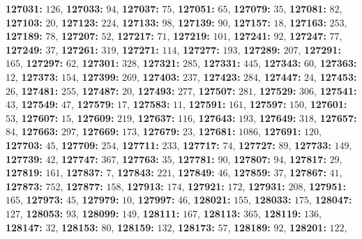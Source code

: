 \textsf{\bfseries 127031:} $126$, \textsf{\bfseries 127033:} $94$, \textsf{\bfseries 127037:} $75$, \textsf{\bfseries 127051:} $65$, \textsf{\bfseries 127079:} $35$, \textsf{\bfseries 127081:} $82$, \textsf{\bfseries 127103:} $20$, \textsf{\bfseries 127123:} $224$, \textsf{\bfseries 127133:} $98$, \textsf{\bfseries 127139:} $90$, \textsf{\bfseries 127157:} $18$, \textsf{\bfseries 127163:} $253$, \textsf{\bfseries 127189:} $78$, \textsf{\bfseries 127207:} $52$, \textsf{\bfseries 127217:} $71$, \textsf{\bfseries 127219:} $101$, \textsf{\bfseries 127241:} $92$, \textsf{\bfseries 127247:} $77$, \textsf{\bfseries 127249:} $37$, \textsf{\bfseries 127261:} $319$, \textsf{\bfseries 127271:} $114$, \textsf{\bfseries 127277:} $193$, \textsf{\bfseries 127289:} $207$, \textsf{\bfseries 127291:} $165$, \textsf{\bfseries 127297:} $62$, \textsf{\bfseries 127301:} $328$, \textsf{\bfseries 127321:} $285$, \textsf{\bfseries 127331:} $445$, \textsf{\bfseries 127343:} $60$, \textsf{\bfseries 127363:} $12$, \textsf{\bfseries 127373:} $154$, \textsf{\bfseries 127399:} $269$, \textsf{\bfseries 127403:} $237$, \textsf{\bfseries 127423:} $284$, \textsf{\bfseries 127447:} $24$, \textsf{\bfseries 127453:} $26$, \textsf{\bfseries 127481:} $255$, \textsf{\bfseries 127487:} $20$, \textsf{\bfseries 127493:} $277$, \textsf{\bfseries 127507:} $281$, \textsf{\bfseries 127529:} $306$, \textsf{\bfseries 127541:} $43$, \textsf{\bfseries 127549:} $47$, \textsf{\bfseries 127579:} $17$, \textsf{\bfseries 127583:} $11$, \textsf{\bfseries 127591:} $161$, \textsf{\bfseries 127597:} $150$, \textsf{\bfseries 127601:} $53$, \textsf{\bfseries 127607:} $15$, \textsf{\bfseries 127609:} $219$, \textsf{\bfseries 127637:} $116$, \textsf{\bfseries 127643:} $193$, \textsf{\bfseries 127649:} $318$, \textsf{\bfseries 127657:} $84$, \textsf{\bfseries 127663:} $297$, \textsf{\bfseries 127669:} $173$, \textsf{\bfseries 127679:} $23$, \textsf{\bfseries 127681:} $1086$, \textsf{\bfseries 127691:} $120$, \textsf{\bfseries 127703:} $45$, \textsf{\bfseries 127709:} $254$, \textsf{\bfseries 127711:} $233$, \textsf{\bfseries 127717:} $74$, \textsf{\bfseries 127727:} $89$, \textsf{\bfseries 127733:} $149$, \textsf{\bfseries 127739:} $42$, \textsf{\bfseries 127747:} $367$, \textsf{\bfseries 127763:} $35$, \textsf{\bfseries 127781:} $90$, \textsf{\bfseries 127807:} $94$, \textsf{\bfseries 127817:} $29$, \textsf{\bfseries 127819:} $161$, \textsf{\bfseries 127837:} $7$, \textsf{\bfseries 127843:} $221$, \textsf{\bfseries 127849:} $46$, \textsf{\bfseries 127859:} $37$, \textsf{\bfseries 127867:} $41$, \textsf{\bfseries 127873:} $752$, \textsf{\bfseries 127877:} $158$, \textsf{\bfseries 127913:} $174$, \textsf{\bfseries 127921:} $172$, \textsf{\bfseries 127931:} $208$, \textsf{\bfseries 127951:} $165$, \textsf{\bfseries 127973:} $45$, \textsf{\bfseries 127979:} $10$, \textsf{\bfseries 127997:} $46$, \textsf{\bfseries 128021:} $155$, \textsf{\bfseries 128033:} $175$, \textsf{\bfseries 128047:} $127$, \textsf{\bfseries 128053:} $93$, \textsf{\bfseries 128099:} $149$, \textsf{\bfseries 128111:} $167$, \textsf{\bfseries 128113:} $365$, \textsf{\bfseries 128119:} $136$, \textsf{\bfseries 128147:} $32$, \textsf{\bfseries 128153:} $80$, \textsf{\bfseries 128159:} $132$, \textsf{\bfseries 128173:} $57$, \textsf{\bfseries 128189:} $92$, \textsf{\bfseries 128201:} $122$, 
